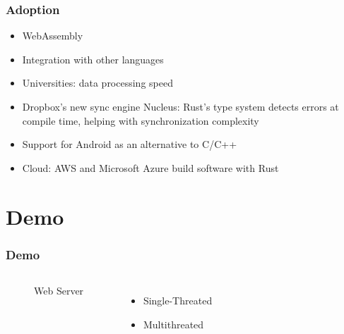 \documentclass{beamer}
\begin{document}
\begin{frame}
\frametitle{Adoption}
\begin{itemize}
\item WebAssembly
\item Integration with other languages
\item Universities: data processing speed
\item Dropbox's new sync engine Nucleus: Rust's type system detects errors at compile time, helping with synchronization complexity
\item Support for Android as an alternative to C/C++
\item Cloud: AWS and Microsoft Azure build software with Rust
\end{itemize}

\end{frame}

\section{Demo}

\begin{frame}
\frametitle{Demo}

\begin{columns}[c] %

  \begin{figure}
    \centering
  \caption{Web Server}
  \end{figure}

\begin{itemize}
\item Single-Threated
\item Multithreated
\end{itemize}

\end{columns}

\end{frame}
\end{document}
